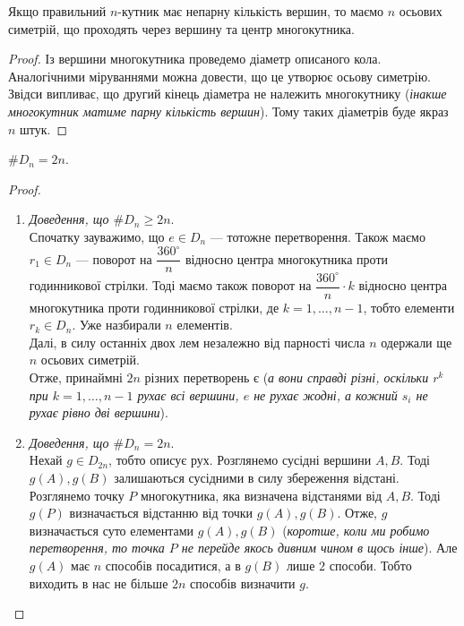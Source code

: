 \documentclass{math_library}
\begin{document}
\begin{lemma}
Якщо правильний $n$-кутник має непарну кількість вершин, то маємо $n$ осьових симетрій, що проходять через вершину та центр многокутника.
\end{lemma}

\begin{proof}
Із вершини многокутника проведемо діаметр описаного кола. Аналогічними міруваннями можна довести, що це утворює осьову симетрію. Звідси випливає, що другий кінець діаметра не належить многокутнику (\textit{інакше многокутник матиме парну кількість вершин}). Тому таких діаметрів буде якраз $n$ штук.
\end{proof}

\begin{theorem}
$\# D_n = 2n$.
\end{theorem}

\begin{proof}
\begin{enumerate}[topsep=0pt,wide=0pt,label={\Roman*.}]
\item \textit{Доведення, що $\# D_n \geq 2n$}.\\
Спочатку зауважимо, що $e \in D_n$ --- тотожне перетворення. Також маємо $r_1 \in D_n$ --- поворот на $\dfrac{360^\circ}{n}$ відносно центра многокутника проти годинникової стрілки. Тоді маємо також поворот на $\dfrac{360^\circ}{n} \cdot k$ відносно центра многокутника проти годинникової стрілки, де $k = 1,\dots,n-1$, тобто елементи $r_k \in D_n$. Уже назбирали $n$ елементів.\\
Далі, в силу останніх двох лем незалежно від парності числа $n$ одержали ще $n$ осьових симетрій.\\
Отже, принаймні $2n$ різних перетворень є (\textit{а вони справді різні, оскільки $r^k$ при $k = 1,\dots,n-1$ рухає всі вершини, $e$ не рухає жодні, а кожний $s_i$ не рухає рівно дві вершини}).

\item \textit{Доведення, що $\# D_n = 2n$}.\\
Нехай $g \in D_{2n}$, тобто описує рух. Розглянемо сусідні вершини $A,B$. Тоді $g(A), g(B)$ залишаються сусідними в силу збереження відстані. Розглянемо точку $P$ многокутника, яка визначена відстанями від $A,B$. Тоді $g(P)$ визначається відстанню від точки $g(A),g(B)$. Отже, $g$ визначається суто елементами $g(A),g(B)$ (\textit{коротше, коли ми робимо перетворення, то точка $P$ не перейде якось дивним чином в щось інше}). Але $g(A)$ має $n$ способів посадитися, а в $g(B)$ лише $2$ способи. Тобто виходить в нас не більше $2n$ способів визначити $g$. \qedhere
\end{enumerate}
\end{proof}
\end{document}
